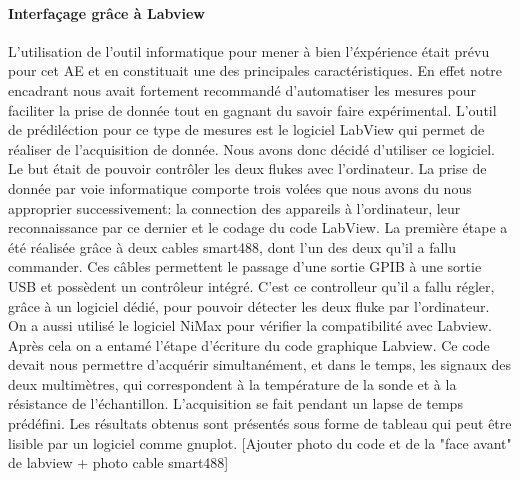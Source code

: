 \paragraph*{Interfaçage grâce à Labview}
L'utilisation de l'outil informatique pour mener à bien l'éxpérience était prévu pour cet AE et en constituait une des principales caractéristiques. En effet notre encadrant nous avait fortement recommandé d'automatiser les mesures pour faciliter la prise de donnée tout en gagnant du savoir faire expérimental. L'outil de prédiléction pour ce type de mesures est le logiciel LabView qui permet de réaliser de l'acquisition de donnée. Nous avons donc décidé d'utiliser ce logiciel. Le but était de pouvoir contrôler les deux flukes avec l'ordinateur. La prise de donnée par voie informatique comporte trois volées que nous avons du nous approprier successivement: la connection des appareils à l'ordinateur, leur reconnaissance par ce dernier et le codage du code LabView. La première étape a été réalisée grâce à deux cables smart488, dont l'un des deux qu'il a fallu commander. Ces câbles permettent le passage d'une sortie GPIB à une sortie USB et possèdent un contrôleur intégré. C'est ce controlleur qu'il a fallu régler, grâce à un logiciel dédié, pour pouvoir détecter les deux fluke par l'ordinateur. On a aussi utilisé le logiciel NiMax pour vérifier la compatibilité avec Labview. Après cela on a entamé l'étape d'écriture du code graphique Labview. Ce code devait nous permettre d'acquérir simultanément, et dans le temps, les signaux des deux multimètres, qui correspondent à la température de la sonde et à la résistance de l'échantillon. L'acquisition se fait pendant un lapse de temps prédéfini. Les résultats obtenus sont présentés sous forme de tableau qui peut être lisible par un logiciel comme gnuplot.
[Ajouter photo du code et de la "face avant" de labview + photo cable smart488]


